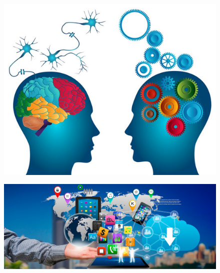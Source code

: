 \documentclass{article}
\begin{document}
\begin{figure}[h!]
\centering
\includegraphics[scale=0.5]{3925.jpg}
\end{figure}

\begin{figure}[h!]
\centering
\includegraphics[scale=0.23]{Android-1.jpg}
\end{figure}
\end{document}
